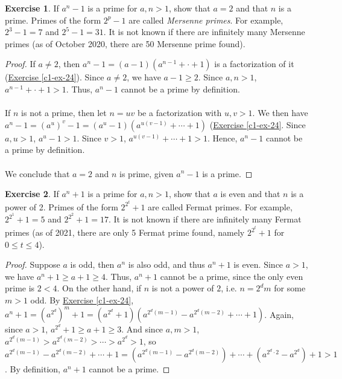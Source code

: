 \documentclass{article}
\theoremstyle{definition}
\newtheorem{exercise}{Exercise}
\begin{document}
\begin{exercise}
If $a^n - 1$ is a prime for $a, n > 1$, show that $a = 2$ and that $n$ is a prime. Primes of the form $2^p - 1$ are called \emph{Mersenne primes}. For example, $2^3 - 1 = 7$ and $2^5 - 1 = 31$. It is not known if there are infinitely many Mersenne primes (as of October 2020, there are 50 Mersenne prime found).
\end{exercise}
\begin{proof}
If $a \neq 2$, then $a^n - 1 = (a - 1) (a^{n - 1} + \cdot + 1)$ is a factorization of it (\hyperref[c1-ex-24]{Exercise \ref*{c1-ex-24}}). Since $a \neq 2$, we have $a - 1 \geq 2$. Since $a, n > 1$, $a^{n - 1} + \cdot + 1 > 1$. Thus, $a^n - 1$ cannot be a prime by definition.
\\
\\
If $n$ is not a prime, then let $n = uv$ be a factorization with $u, v > 1$. We then have $a^n - 1 = (a^u)^v - 1 = (a^u - 1) (a^{u(v - 1)} + \cdots + 1)$ (\hyperref[c1-ex-24]{Exercise \ref*{c1-ex-24}}. Since $a, u > 1$, $a^u - 1 > 1$. Since $v > 1$, $a^{u(v - 1)} + \cdots + 1 > 1$. Hence, $a^n - 1$ cannot be a prime by definition.
\\
\\
We conclude that $a = 2$ and $n$ is prime, given $a^n - 1$ is a prime.
\end{proof}

\newpage

\begin{exercise}
If $a^n + 1$ is a prime for $a, n > 1$, show that $a$ is even and that $n$ is a power of 2. Primes of the form $2^{2^t} + 1$ are called Fermat primes. For example, $2^{2^1} + 1 = 5$ and $2^{2^2} + 1 = 17$. It is not known if there are infinitely many Fermat primes (as of 2021, there are only 5 Fermat prime found, namely $2^{2^t} + 1$ for $0 \leq t \leq 4$).
\end{exercise}
\begin{proof}
Suppose $a$ is odd, then $a^n$ is also odd, and thus $a^n + 1$ is even. Since $a > 1$, we have $a^n + 1 \geq a + 1 \geq 4$. Thus, $a^n + 1$ cannot be a prime, since the only even prime is $2 < 4$. On the other hand, if $n$ is not a power of $2$, i.e. $n = 2^d m$ for some $m > 1$ odd. By \hyperref[c1-ex-24]{Exercise \ref*{c1-ex-24}}, $a^n + 1 = (a^{2^d})^m + 1 = (a^{2^d} + 1)(a^{2^d (m - 1)} - a^{2^d (m - 2)} + \cdots + 1)$. Again, since $a > 1$, $a^{2^d} + 1 \geq a + 1 \geq 3$. And since $a, m > 1$, $a^{2^d (m - 1)} > a^{2^d (m - 2)} > \cdots > a^{2^d} > 1$, so $a^{2^d (m - 1)} - a^{2^d (m - 2)} + \cdots + 1 = (a^{2^d (m - 1)} - a^{2^d (m - 2)}) + \cdots + (a^{2^d \cdot 2} - a^{2^d}) + 1 > 1$. By definition, $a^n + 1$ cannot be a prime.
\end{proof}
\end{document}
